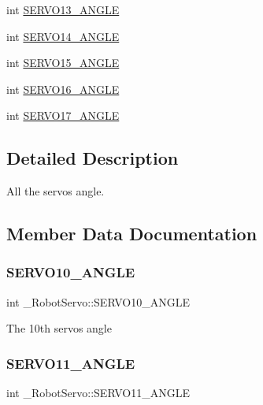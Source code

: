 \begin{DoxyCompactItemize}
\item 
int \hyperlink{struct__RobotServo_ac1530cdca5a387c5ccc941d3891af08d}{S\+E\+R\+V\+O13\+\_\+\+A\+N\+G\+LE}
\item 
int \hyperlink{struct__RobotServo_a50ead1cc511b9ea1618bc9e59e514088}{S\+E\+R\+V\+O14\+\_\+\+A\+N\+G\+LE}
\item 
int \hyperlink{struct__RobotServo_acf3c875be25e00720f65d74061aa7e0a}{S\+E\+R\+V\+O15\+\_\+\+A\+N\+G\+LE}
\item 
int \hyperlink{struct__RobotServo_a14c22b0274e8410f07dbf4f6583810bd}{S\+E\+R\+V\+O16\+\_\+\+A\+N\+G\+LE}
\item 
int \hyperlink{struct__RobotServo_a5cba65ebea9f2146007555e299ec9b91}{S\+E\+R\+V\+O17\+\_\+\+A\+N\+G\+LE}
\end{DoxyCompactItemize}


\subsection{Detailed Description}
All the servos angle. 

\subsection{Member Data Documentation}
\mbox{\label{struct__RobotServo_a49ee2878d449d0c5f9578abdc6ea7b67}} 
\subsubsection{\texorpdfstring{S\+E\+R\+V\+O10\+\_\+\+A\+N\+G\+LE}{SERVO10\_ANGLE}}
{\footnotesize\ttfamily int \+\_\+\+Robot\+Servo\+::\+S\+E\+R\+V\+O10\+\_\+\+A\+N\+G\+LE}

The 10th servo\textquotesingle{}s angle \mbox{\label{struct__RobotServo_ad98e244e46ee9b7b66799a5afab0dd85}} 
\subsubsection{\texorpdfstring{S\+E\+R\+V\+O11\+\_\+\+A\+N\+G\+LE}{SERVO11\_ANGLE}}
{\footnotesize\ttfamily int \+\_\+\+Robot\+Servo\+::\+S\+E\+R\+V\+O11\+\_\+\+A\+N\+G\+LE}

